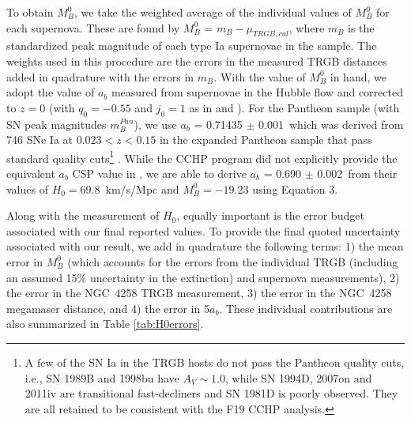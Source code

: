 \documentclass[twocolumn]{aastex62}
\newcommand{\abPan}{0.71435 $\pm$ 0.001}
\newcommand{\abCSP}{0.690 $\pm$ 0.002}
\begin{document}
To obtain $M^{0}_{B}$, we take the weighted average of the individual values of $M^{0}_{B}$ for each supernova. These are found by $M^{0}_{B}$ = $m_{B}-\mu_{TRGB,cal}$, where $m_{B}$ is the standardized peak magnitude of each type Ia supernovae in the sample. The weights used in this procedure are the errors in the measured TRGB distances added in quadrature with the errors in $m_{B}$. With the value of $M^{0}_{B}$ in hand, we adopt the value of $a_{b}$ measured from supernovae in the Hubble flow and corrected to $z=0$ (with $q_0=-0.55$ and $j_0=1$ as in \citealt{2016ApJ...826...56R} and \citealt{2019ApJ...882...34F}). For the Pantheon sample (with SN peak magnitudes $m_B^{Pan}$), we use $a_{b}$ = \abPan \ which was derived from 746 SNe Ia at $0.023 < z < 0.15$ in the expanded Pantheon sample that pass standard quality cuts\footnote{A few of the SN Ia in the TRGB hosts do not pass the Pantheon quality cuts, i.e., SN 1989B and 1998bu have $A_V \sim 1.0$, while SN 1994D, 2007on and 2011iv are transitional fast-decliners and SN 1981D is poorly observed. They are all retained to be consistent with the F19 CCHP analysis.} \citep{2018ApJ...859..101S, 2022arXiv220204077B}. While the CCHP program did not explicitly provide the equivalent $a_b$ CSP value in \cite{2019ApJ...882...34F}, we are able to derive $a_{b}$ = \abCSP \ from their values of $H_0=69.8$~km/s/Mpc and $M^{0}_{B}=-19.23$ using Equation 3.

Along with the measurement of $H_{0}$, equally important is the error budget associated with our final reported values. To provide the final quoted uncertainty associated with our result, we add in quadrature the following terms: 1) the mean error in $M^{0}_{B}$ (which accounts for the errors from the individual TRGB (including an assumed 15$\%$ uncertainty in the extinction) and supernova measurements), 2) the error in the NGC~4258 TRGB measurement, 3) the error in the NGC~4258 megamaser distance, and 4) the error in 5$a_{b}$. These individual contributions are also summarized in Table \ref{tab:H0errors}.
\end{document}
